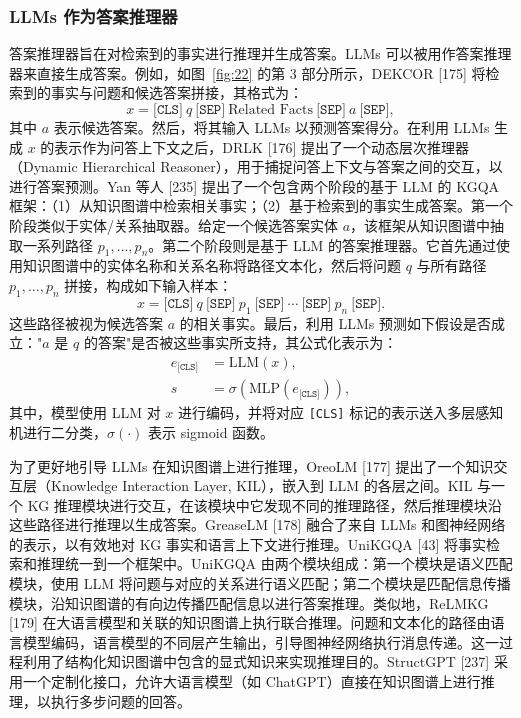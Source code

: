 \documentclass[11pt,UTF8,fontset=fandol]{ctexart}
\begin{document}
\subsubsection{LLMs 作为答案推理器}

答案推理器旨在对检索到的事实进行推理并生成答案。LLMs 可以被用作答案推理器来直接生成答案。例如，如图~\ref{fig:22} 的第 3 部分所示，DEKCOR [175] 将检索到的事实与问题和候选答案拼接，其格式为：
\begin{equation}
x = \texttt{[CLS]}\ q\ \texttt{[SEP]}\ \text{Related Facts}\ \texttt{[SEP]}\ a\ \texttt{[SEP]}, \tag{15}
\end{equation}
其中 $a$ 表示候选答案。然后，将其输入 LLMs 以预测答案得分。在利用 LLMs 生成 $x$ 的表示作为问答上下文之后，DRLK [176] 提出了一个动态层次推理器（Dynamic Hierarchical Reasoner），用于捕捉问答上下文与答案之间的交互，以进行答案预测。Yan 等人 [235] 提出了一个包含两个阶段的基于 LLM 的 KGQA 框架：（1）从知识图谱中检索相关事实；（2）基于检索到的事实生成答案。第一个阶段类似于实体/关系抽取器。给定一个候选答案实体 $a$，该框架从知识图谱中抽取一系列路径 $p_1, \ldots, p_n$。第二个阶段则是基于 LLM 的答案推理器。它首先通过使用知识图谱中的实体名称和关系名称将路径文本化，然后将问题 $q$ 与所有路径 $p_1, \ldots, p_n$ 拼接，构成如下输入样本：
\begin{equation}
x = \texttt{[CLS]}\ q\ \texttt{[SEP]}\ p_1\ \texttt{[SEP]}\ \cdots\ \texttt{[SEP]}\ p_n\ \texttt{[SEP]}. \tag{16}
\end{equation}
这些路径被视为候选答案 $a$ 的相关事实。最后，利用 LLMs 预测如下假设是否成立："$a$ 是 $q$ 的答案"是否被这些事实所支持，其公式化表示为：
\begin{align}
e_{\texttt{[CLS]}} &= \text{LLM}(x), \tag{17} \\
s &= \sigma(\text{MLP}(e_{\texttt{[CLS]}})), \tag{18}
\end{align}
其中，模型使用 LLM 对 $x$ 进行编码，并将对应 \texttt{[CLS]} 标记的表示送入多层感知机进行二分类，$\sigma(\cdot)$ 表示 sigmoid 函数。

为了更好地引导 LLMs 在知识图谱上进行推理，OreoLM [177] 提出了一个知识交互层（Knowledge Interaction Layer, KIL），嵌入到 LLM 的各层之间。KIL 与一个 KG 推理模块进行交互，在该模块中它发现不同的推理路径，然后推理模块沿这些路径进行推理以生成答案。GreaseLM [178] 融合了来自 LLMs 和图神经网络的表示，以有效地对 KG 事实和语言上下文进行推理。UniKGQA [43] 将事实检索和推理统一到一个框架中。UniKGQA 由两个模块组成：第一个模块是语义匹配模块，使用 LLM 将问题与对应的关系进行语义匹配；第二个模块是匹配信息传播模块，沿知识图谱的有向边传播匹配信息以进行答案推理。类似地，ReLMKG [179] 在大语言模型和关联的知识图谱上执行联合推理。问题和文本化的路径由语言模型编码，语言模型的不同层产生输出，引导图神经网络执行消息传递。这一过程利用了结构化知识图谱中包含的显式知识来实现推理目的。StructGPT [237] 采用一个定制化接口，允许大语言模型（如 ChatGPT）直接在知识图谱上进行推理，以执行多步问题的回答。
\end{document}
